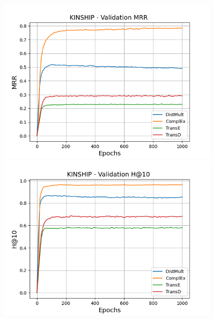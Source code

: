 \begin{figure}[H]
    \centering
    \begin{minipage}{.3\textwidth}
      \centering
      \includegraphics[width=\linewidth]{figures/results/pretrain/kinship/pretrain_kinship_mrrs.png}
    \end{minipage}%
    \begin{minipage}{.3\textwidth}
      \centering
      \includegraphics[width=\linewidth]{figures/results/pretrain/kinship/pretrain_kinship_hit10.png}
    \end{minipage}
    \begin{minipage}{.3\textwidth}
      \centering

\end{minipage}
\end{figure}
